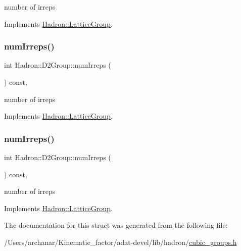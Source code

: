 number of irreps 

Implements \mbox{\hyperlink{structHadron_1_1LatticeGroup_a3edaca488144b5d2a9cf73fe653add34}{Hadron\+::\+Lattice\+Group}}.

\mbox{\label{structHadron_1_1D2Group_a24644ff5f0fc06adeb26457c9ce772a5}} 
\subsubsection{\texorpdfstring{numIrreps()}{numIrreps()}\hspace{0.1cm}{\footnotesize\ttfamily [2/3]}}
{\footnotesize\ttfamily int Hadron\+::\+D2\+Group\+::num\+Irreps (\begin{DoxyParamCaption}{ }\end{DoxyParamCaption}) const\hspace{0.3cm}{\ttfamily [inline]}, {\ttfamily [virtual]}}

number of irreps 

Implements \mbox{\hyperlink{structHadron_1_1LatticeGroup_a3edaca488144b5d2a9cf73fe653add34}{Hadron\+::\+Lattice\+Group}}.

\mbox{\label{structHadron_1_1D2Group_a24644ff5f0fc06adeb26457c9ce772a5}} 
\subsubsection{\texorpdfstring{numIrreps()}{numIrreps()}\hspace{0.1cm}{\footnotesize\ttfamily [3/3]}}
{\footnotesize\ttfamily int Hadron\+::\+D2\+Group\+::num\+Irreps (\begin{DoxyParamCaption}{ }\end{DoxyParamCaption}) const\hspace{0.3cm}{\ttfamily [inline]}, {\ttfamily [virtual]}}

number of irreps 

Implements \mbox{\hyperlink{structHadron_1_1LatticeGroup_a3edaca488144b5d2a9cf73fe653add34}{Hadron\+::\+Lattice\+Group}}.



The documentation for this struct was generated from the following file\+:\begin{DoxyCompactItemize}
\item 
/\+Users/archanar/\+Kinematic\+\_\+factor/adat-\/devel/lib/hadron/\mbox{\hyperlink{adat-devel_2lib_2hadron_2cubic__groups_8h}{cubic\+\_\+groups.\+h}}\end{DoxyCompactItemize}
